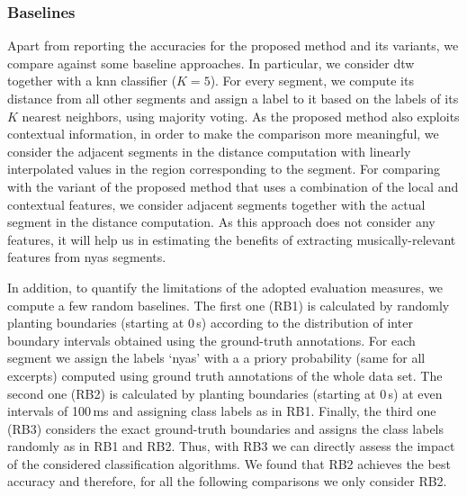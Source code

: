 {\subsubsection{Baselines}

Apart from reporting the accuracies for the proposed method and its variants, we compare against some baseline approaches. In particular, we consider \gls{dtw} together with a \gls{knn} classifier ($K=5$). For every segment, we compute its distance from all other segments and assign a label to it based on the labels of its $K$ nearest neighbors, using majority voting. As the proposed method also exploits contextual information, in order to make the comparison more meaningful, we consider the adjacent segments in the distance computation with linearly interpolated values in the region corresponding to the segment. For comparing with the variant of the proposed method that uses a combination of the local and contextual features, we consider adjacent segments together with the actual segment in the distance computation. As this approach does not consider any features, it will help us in estimating the benefits of extracting musically-relevant features from \gls{nyas} segments. 

In addition, to quantify the limitations of the adopted evaluation measures, we compute a few random baselines. The first one (RB1) is calculated by randomly planting boundaries (starting at 0\,s) according to the distribution of inter boundary intervals obtained using the ground-truth annotations. For each segment we assign the labels `\gls{nyas}' with a a priory probability (same for all excerpts) computed using ground truth annotations of the whole data set. The second one (RB2) is calculated by planting boundaries (starting at 0\,s) at even intervals of 100\,ms and assigning class labels as in RB1. Finally, the third one (RB3) considers the exact ground-truth boundaries and assigns the class labels randomly as in RB1 and RB2. Thus, with RB3 we can directly assess the impact of the considered classification algorithms. We found that RB2 achieves the best accuracy and therefore, for all the following comparisons we only consider RB2.

%

}
